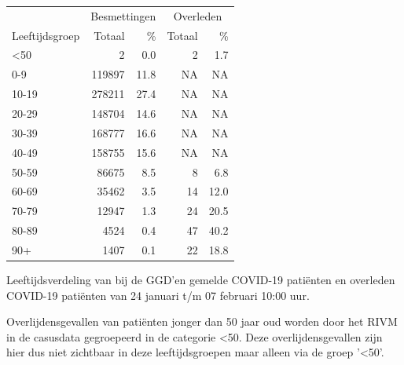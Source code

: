 \documentclass[
  english,
  man,floatsintext]{apa6}
\begin{document}
\begin{table}
\centering\begingroup\fontsize{11}{13}\selectfont

\begin{threeparttable}
\begin{tabular}{lrrrr}
\toprule
\multicolumn{1}{c}{ } & \multicolumn{2}{c}{Besmettingen} & \multicolumn{2}{c}{Overleden} \\
\cmidrule(l{3pt}r{3pt}){2-3} \cmidrule(l{3pt}r{3pt}){4-5}
Leeftijdsgroep & Totaal & \% & Totaal & \%\\
\midrule
<50 & 2 & 0.0 & 2 & 1.7\\
0-9 & 119897 & 11.8 & NA & NA\\
10-19 & 278211 & 27.4 & NA & NA\\
20-29 & 148704 & 14.6 & NA & NA\\
30-39 & 168777 & 16.6 & NA & NA\\
40-49 & 158755 & 15.6 & NA & NA\\
50-59 & 86675 & 8.5 & 8 & 6.8\\
60-69 & 35462 & 3.5 & 14 & 12.0\\
70-79 & 12947 & 1.3 & 24 & 20.5\\
80-89 & 4524 & 0.4 & 47 & 40.2\\
90+ & 1407 & 0.1 & 22 & 18.8\\
\bottomrule
\end{tabular}
\begin{tablenotes}
\item[1] Leeftijdsverdeling van bij de GGD’en gemelde COVID-19 patiënten en overleden COVID-19 patiënten van 24 januari t/m 07 februari 10:00 uur.
\item[2] Overlijdensgevallen van patiënten jonger dan 50 jaar oud worden door het RIVM in de casusdata gegroepeerd in de categorie <50. Deze overlijdensgevallen zijn hier dus niet zichtbaar in deze leeftijdsgroepen maar alleen via de groep '<50'.
\end{tablenotes}
\end{threeparttable}
\endgroup{}
\end{table}

\newpage
\end{document}

